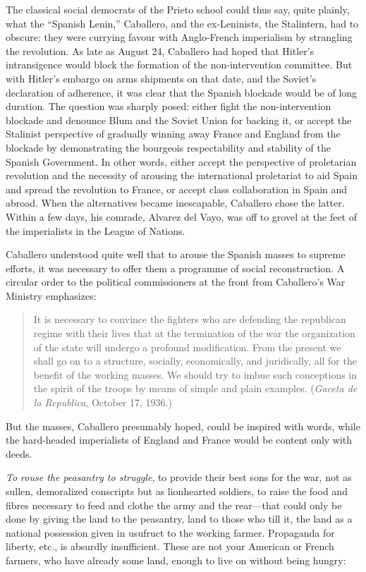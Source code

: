 The classical social democrats of the Prieto school could thus say, quite plainly, what the ``Spanish Lenin,'' Caballero, and the ex-Le\-ni\-nists, the Stalintern, had to obscure: they were currying favour with Anglo-French imperialism by strangling the revolution. As late as August 24, Caballero had hoped that Hitler’s intransigence would block the formation of the non-intervention committee. But with Hitler’s embargo on arms shipments on that date, and the Soviet’s declaration of adherence, it was clear that the Spanish blockade would be of long duration. The question was sharply posed: either fight the non-intervention blockade and denounce Blum and the Soviet Union for backing it, or accept the Stalinist perspective of gradually winning away France and England from the blockade by demonstrating the bourgeois respectability and stability of the Spanish Government. In other words, either accept the perspective of proletarian revolution and the necessity of arousing the international proletariat to aid Spain and spread the revolution to France, or accept class collaboration in Spain and abroad. When the alternatives became inescapable, Caballero chose the latter. Within a few days, his comrade, Alvarez del Vayo, was off to grovel at the feet of the imperialists in the League of Nations.

Caballero understood quite well that to arouse the Spanish masses to supreme efforts, it was necessary to offer them a programme of social reconstruction. A circular order to the political commissioners at the front from Caballero’s War Ministry emphasizes:

\begin{quotation}
  It is necessary to convince the fighters who are defending the republican regime with their lives that at the termination of the war the organization of the state will undergo a profound modification. From the present we shall go on to a structure, socially, economically, and juridically, all for the benefit of the working masses. We should try to imbue such conceptions in the spirit of the troops by means of simple and plain examples. (\emph{Gaceta de la Republica}, October 17, 1936.)
\end{quotation}

But the masses, Caballero presumably hoped, could be inspired with words, while the hard-headed imperialists of England and France would be content only with deeds.

\emph{To rouse the peasantry to struggle}, to provide their best sons for the war, not as sullen, demoralized conscripts but as lionhearted soldiers, to raise the food and fibres necessary to feed and clothe the army and the rear---that could only be done by giving the land to the peasantry, land to those who till it, the land as a national possession given in usufruct to the working farmer. Propaganda for liberty, etc., is absurdly insufficient. These are not your American or French farmers, who have already some land, enough to live on without being hungry:

